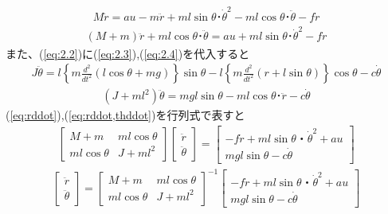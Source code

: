 \documentclass[a4j,11pt,twoside]{ujbook}
\begin{document}
			\begin{eqnarray*}
				M\ddot{r} = au - m\ddot{r}+ml\sin{\theta} ･ {\dot{\theta}}^2 - ml\cos{\theta}･\ddot{\theta}-f\dot{r}
			\end{eqnarray*}
			\begin{eqnarray}
			\left( M+m \right) \ddot{r} + ml\cos{\theta}･\ddot{\theta} = au + ml\sin{\theta} ･ {\dot{\theta}}^2-f\dot{r}
			\label{eq:rddot}
			\end{eqnarray}
			また、(\ref{eq:2.2})に(\ref{eq:2.3}),(\ref{eq:2.4})を代入すると
			\begin{eqnarray*}
				J\ddot{\theta} = l\left\lbrace  m\frac{d^2}{dt^2}\left(l\cos{\theta}+mg\right) \right\rbrace\sin{\theta}
				- l \left\lbrace m\frac{d^2}{dt^2}(r+l\sin{\theta}) \right\rbrace\cos{\theta}-c\dot{\theta}
			\end{eqnarray*}
			\begin{eqnarray}
				(J+ml^2)\ddot{\theta}=mgl\sin{\theta}-ml\cos{\theta}･\ddot{r}-c\dot{\theta}
				\label{eq:rddot,thddot}
			\end{eqnarray}
			(\ref{eq:rddot}),(\ref{eq:rddot,thddot})を行列式で表すと
			\begin{eqnarray*}
				\left[
					\begin{array}{cc}
						M+m & ml\cos{\theta}\\
						ml\cos{\theta} & J+ml^2
					\end{array}
				\right]
				\left[
					\begin{array}{c}
						\ddot{r} \\
						\ddot{\theta}
					\end{array}
				\right] 
				=
				\left[
					\begin{array}{c}
						- f \dot{r} + ml\sin{\theta}・\dot{\theta}^2 + au\\
						mgl\sin{\theta} - c\dot{\theta}
					\end{array}
				\right]
			\end{eqnarray*}
			\begin{eqnarray*}
				\left[
					\begin{array}{c}
						\ddot{r} \\
						\ddot{\theta}
					\end{array}
				\right]
				 =
				\left[
					\begin{array}{cc}
						M+m & ml\cos{\theta}\\
						ml\cos{\theta} & J+ml^2
					\end{array}
				\right]^{-1}
				\left[
					\begin{array}{c}
						- f \dot{r} + ml\sin{\theta}・\dot{\theta}^2 + au\\
						mgl\sin{\theta} - c\dot{\theta}
					\end{array}
				\right]
			\end{eqnarray*}
\end{document}
